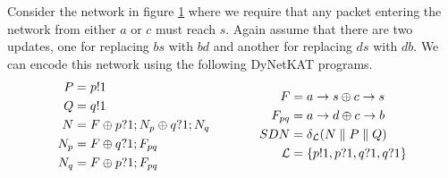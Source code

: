 \begin{example}
    \begin{figure}
        \centering
        \caption{ }
        \label{fig:blackhole}
    \end{figure}
    Consider the network in figure \ref{fig:blackhole} where
    we require that any packet entering the network from
    either $a$ or $c$ must reach $s$.
    Again assume that there are two updates, one for replacing
    $bs$ with $bd$ and another for replacing $ds$ with $db$.
    We can encode this network using the following DyNetKAT programs.
    \begin{equation*}
        \begin{aligned}[c]
            P   & = p!1                             \\
            Q   & = q!1                             \\
            N   & = F \oplus p?1;N_p \oplus q?1;N_q \\
            N_p & = F \oplus q?1;F_{pq}             \\
            N_q & = F \oplus p?1;F_{pq}
        \end{aligned}
        \qquad\qquad
        \begin{aligned}[c]
            F           & = a\rightarrow s \oplus c\rightarrow s    \\
            F_{pq}      & = a\rightarrow d \oplus c\rightarrow b    \\
            SDN         & = \delta_{\mathcal{L}} (N
            \parallel P \parallel Q)                \\
            \mathcal{L} & = \{p!1,p?1,q?1,q?1\}
        \end{aligned}
    \end{equation*}

\end{example}
